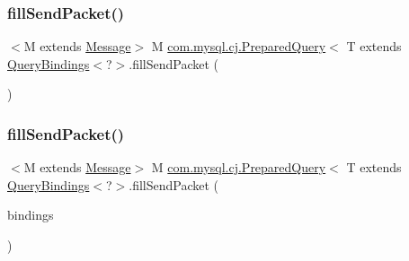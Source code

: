 \mbox{\label{interfacecom_1_1mysql_1_1cj_1_1_prepared_query_aa466e879cf875af6ddbd571940192eac}} 
\subsubsection{\texorpdfstring{fill\+Send\+Packet()}{fillSendPacket()}\hspace{0.1cm}{\footnotesize\ttfamily [1/2]}}
{\footnotesize\ttfamily $<$M extends \mbox{\hyperlink{interfacecom_1_1mysql_1_1cj_1_1protocol_1_1_message}{Message}}$>$ M \mbox{\hyperlink{interfacecom_1_1mysql_1_1cj_1_1_prepared_query}{com.\+mysql.\+cj.\+Prepared\+Query}}$<$ T extends \mbox{\hyperlink{interfacecom_1_1mysql_1_1cj_1_1_query_bindings}{Query\+Bindings}}$<$?$>$.fill\+Send\+Packet (\begin{DoxyParamCaption}{ }\end{DoxyParamCaption})}

\mbox{\label{interfacecom_1_1mysql_1_1cj_1_1_prepared_query_aab23700381df4cf13e7f1801ff0024c2}} 
\subsubsection{\texorpdfstring{fill\+Send\+Packet()}{fillSendPacket()}\hspace{0.1cm}{\footnotesize\ttfamily [2/2]}}
{\footnotesize\ttfamily $<$M extends \mbox{\hyperlink{interfacecom_1_1mysql_1_1cj_1_1protocol_1_1_message}{Message}}$>$ M \mbox{\hyperlink{interfacecom_1_1mysql_1_1cj_1_1_prepared_query}{com.\+mysql.\+cj.\+Prepared\+Query}}$<$ T extends \mbox{\hyperlink{interfacecom_1_1mysql_1_1cj_1_1_query_bindings}{Query\+Bindings}}$<$?$>$.fill\+Send\+Packet (\begin{DoxyParamCaption}\item[{\mbox{\hyperlink{interfacecom_1_1mysql_1_1cj_1_1_query_bindings}{Query\+Bindings}}$<$?$>$}]{bindings }\end{DoxyParamCaption})}

